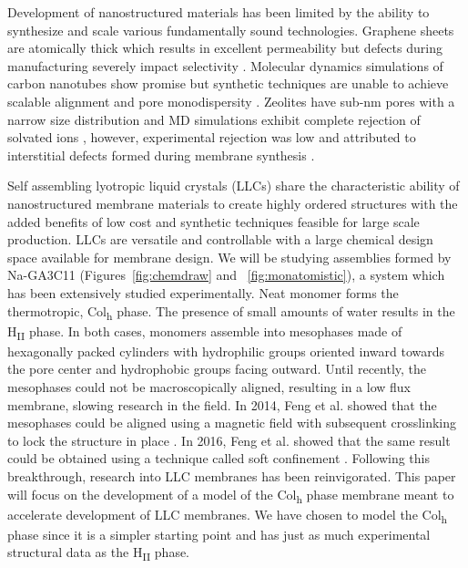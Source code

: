 Development of nanostructured materials has been limited by the ability
to synthesize and scale various fundamentally sound technologies.
Graphene sheets are atomically thick which results in excellent permeability
but defects during manufacturing severely impact selectivity 
\cite{cohen-tanugi_multilayer_2016}. Molecular dynamics simulations of
carbon nanotubes show promise \cite{humplik_nanostructured_2011} but 
synthetic techniques are unable to achieve scalable alignment and pore
monodispersity \cite{hata_water-assisted_2004,maruyama_growth_2005}.
Zeolites have sub-nm pores with a narrow size distribution and MD simulations
exhibit complete rejection of solvated ions \cite{murad_molecular_1998},
however, experimental rejection was low and attributed to interstitial
defects formed during membrane synthesis \cite{li_desalination_2004}.
	  
Self assembling lyotropic liquid crystals (LLCs) share the characteristic
ability of nanostructured membrane materials to create highly ordered 
structures with the added benefits of low cost and synthetic techniques
feasible for large scale production\cite{feng_scalable_2014}. LLCs are
versatile and controllable with a large chemical design space available
for membrane design. We will be studying assemblies formed by Na-GA3C11 
(Figures~\ref{fig:chemdraw} and ~\ref{fig:monatomistic}), a system which
has been extensively studied experimentally\cite{smith_ordered_1997,
zhou_supported_2005,resel_h2-phase_2000,feng_scalable_2014,feng_thin_2016}. 
Neat monomer forms the thermotropic, Col\textsubscript{h} phase. The 
presence of small amounts of water results in the H\textsubscript{II} 
phase. In both cases, monomers assemble into mesophases made of 
hexagonally packed cylinders with hydrophilic groups oriented inward
towards the pore center and hydrophobic groups facing outward. Until
recently, the mesophases could not be macroscopically aligned, resulting
in a low flux membrane, slowing research in the field. In 2014, 
Feng et al. showed that the mesophases could be aligned using a magnetic
field with subsequent crosslinking to lock the structure in place
\cite{feng_scalable_2014}. In 2016, Feng et al. showed that the same 
result could be obtained using a technique called soft confinement
\cite{feng_thin_2016}. Following this breakthrough, research into LLC
membranes has been reinvigorated. This paper will focus on 
the development of a model of the Col\textsubscript{h} phase membrane
meant to accelerate development of LLC membranes. We have chosen to 
model the Col\textsubscript{h} phase since it is a simpler starting 
point and has just as much experimental structural data as the 
H\textsubscript{II} phase. 
	
